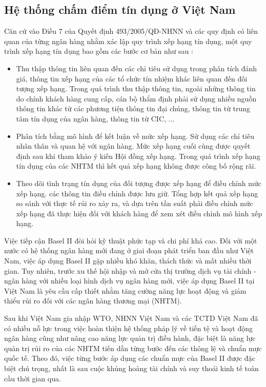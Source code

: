 \subsection{Hệ thống chấm điểm tín dụng ở Việt Nam}
Căn cứ vào Điều 7 của Quyết định 493/2005/QĐ-NHNN và các quy định có liên quan của từng ngân hàng nhằm xác lập quy trình xếp hạng tín dụng, một quy trình 
xếp hạng tín dụng bao gồm các bước cơ bản như sau : 
\begin{itemize}
\item Thu thập thông tin liên quan đến các chỉ tiêu sử dụng trong phân tích đánh giá, thông tin xếp hạng của các tổ chức tín nhiệm khác liên quan đến đối tượng xếp hạng. Trong quá trình thu thập thông tin, ngoài những thông tin do chính khách hàng cung cấp, cán bộ thẩm định phải sử dụng nhiều nguồn thông tin khác từ các phương tiện thông tin đại chúng, thông tin từ trung tâm tín dụng của ngân hàng, thông tin từ CIC, ...
\item Phân tích bằng mô hình để kết luận về mức xếp hạng. Sử dụng các chỉ tiêu nhân thân và quan hệ với ngân hàng. Mức xếp hạng cuối cùng được quyết định sau khi tham khảo ý kiến Hội đồng xếp hạng. Trong quá trình xếp hạng tín dụng của các NHTM thì kết quả xếp hạng không được công bố rộng rãi.
\item Theo dõi tình trạng tín dụng của đối tượng được xếp hạng để điều chỉnh mức xếp hạng. các thông tin điều chỉnh được lưu giữ. Tổng hợp kết quả xếp hạng so sánh với thực tế rủi ro xảy ra, và dựa trên tần suất phải điều chỉnh mức xếp hạng đã thực hiện đối với khách hàng để xem xét điều chỉnh mô hình xếp hạng.
\end{itemize}

Việc tiếp cận Basel II đòi hỏi kỹ thuật phức tạp và chi phí khá cao. Đối với một nước có hệ thống ngân hàng mới đang ở giai đoạn phát triển ban đầu như Việt Nam, việc áp dụng Basel II gặp nhiều khó khăn, thách thức và mất nhiều thời gian. Tuy nhiên, trước xu thế hội nhập và mở cửa thị trường dịch vụ tài chính - ngân hàng với nhiều loại hình dịch vụ ngân hàng mới, việc áp dụng Basel II tại Việt Nam là yêu cầu cấp thiết nhằm tăng cường năng lực hoạt động và giảm thiểu rủi ro đối với các ngân hàng thương mại (NHTM).

Sau khi Việt Nam gia nhập WTO, NHNN Việt Nam và các TCTD Việt Nam đã có nhiều nỗ lực trong việc hoàn thiện hệ thống pháp lý về tiền tệ và hoạt động ngân hàng cũng như nâng cao năng lực quản trị điều hành, đặc biệt là năng lực quản trị rủi ro của các NHTM tiến dần từng bước đến các thông lệ và chuẩn mực quốc tế. Theo đó, việc từng bước áp dụng các chuẩn mực của Basel II được đặc biệt chú trọng, nhất là sau cuộc khủng hoảng tài chính và suy thoái kinh tế toàn cầu thời gian qua.

